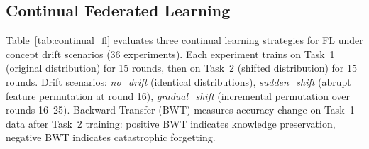 \documentclass[conference]{IEEEtran}
\begin{document}
\subsection{Continual Federated Learning}
\label{sec:continual_exp}

Table~\ref{tab:continual_fl} evaluates three continual learning strategies for FL under concept drift scenarios (36 experiments). Each experiment trains on Task~1 (original distribution) for 15 rounds, then on Task~2 (shifted distribution) for 15 rounds. Drift scenarios: \textit{no\_drift} (identical distributions), \textit{sudden\_shift} (abrupt feature permutation at round 16), \textit{gradual\_shift} (incremental permutation over rounds 16--25). Backward Transfer (BWT) measures accuracy change on Task~1 data after Task~2 training: positive BWT indicates knowledge preservation, negative BWT indicates catastrophic forgetting.
\end{document}

